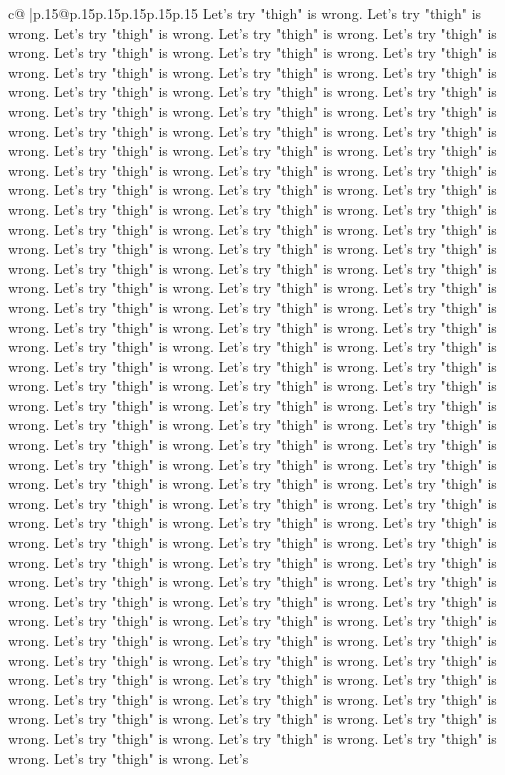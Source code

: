 \documentclass{article}
\begin{document}
{\begin{supertabular}{c@{$\;$}|p{.15\linewidth}@{}p{.15\linewidth}p{.15\linewidth}p{.15\linewidth}p{.15\linewidth}p{.15\linewidth}}
{{{Let's try "thigh" is wrong. Let's try "thigh" is wrong. Let's try "thigh" is wrong. Let's try "thigh" is wrong. Let's try "thigh" is wrong. Let's try "thigh" is wrong. Let's try "thigh" is wrong. Let's try "thigh" is wrong. Let's try "thigh" is wrong. Let's try "thigh" is wrong. Let's try "thigh" is wrong. Let's try "thigh" is wrong. Let's try "thigh" is wrong. Let's try "thigh" is wrong. Let's try "thigh" is wrong. Let's try "thigh" is wrong. Let's try "thigh" is wrong. Let's try "thigh" is wrong. Let's try "thigh" is wrong. Let's try "thigh" is wrong. Let's try "thigh" is wrong. Let's try "thigh" is wrong. Let's try "thigh" is wrong. Let's try "thigh" is wrong. Let's try "thigh" is wrong. Let's try "thigh" is wrong. Let's try "thigh" is wrong. Let's try "thigh" is wrong. Let's try "thigh" is wrong. Let's try "thigh" is wrong. Let's try "thigh" is wrong. Let's try "thigh" is wrong. Let's try "thigh" is wrong. Let's try "thigh" is wrong. Let's try "thigh" is wrong. Let's try "thigh" is wrong. Let's try "thigh" is wrong. Let's try "thigh" is wrong. Let's try "thigh" is wrong. Let's try "thigh" is wrong. Let's try "thigh" is wrong. Let's try "thigh" is wrong. Let's try "thigh" is wrong. Let's try "thigh" is wrong. Let's try "thigh" is wrong. Let's try "thigh" is wrong. Let's try "thigh" is wrong. Let's try "thigh" is wrong. Let's try "thigh" is wrong. Let's try "thigh" is wrong. Let's try "thigh" is wrong. Let's try "thigh" is wrong. Let's try "thigh" is wrong. Let's try "thigh" is wrong. Let's try "thigh" is wrong. Let's try "thigh" is wrong. Let's try "thigh" is wrong. Let's try "thigh" is wrong. Let's try "thigh" is wrong. Let's try "thigh" is wrong. Let's try "thigh" is wrong. Let's try "thigh" is wrong. Let's try "thigh" is wrong. Let's try "thigh" is wrong. Let's try "thigh" is wrong. Let's try "thigh" is wrong. Let's try "thigh" is wrong. Let's try "thigh" is wrong. Let's try "thigh" is wrong. Let's try "thigh" is wrong. Let's try "thigh" is wrong. Let's try "thigh" is wrong. Let's try "thigh" is wrong. Let's try "thigh" is wrong. Let's try "thigh" is wrong. Let's try "thigh" is wrong. Let's try "thigh" is wrong. Let's try "thigh" is wrong. Let's try "thigh" is wrong. Let's try "thigh" is wrong. Let's try "thigh" is wrong. Let's try "thigh" is wrong. Let's try "thigh" is wrong. Let's try "thigh" is wrong. Let's try "thigh" is wrong. Let's try "thigh" is wrong. Let's try "thigh" is wrong. Let's try "thigh" is wrong. Let's try "thigh" is wrong. Let's try "thigh" is wrong. Let's try "thigh" is wrong. Let's try "thigh" is wrong. Let's try "thigh" is wrong. Let's try "thigh" is wrong. Let's try "thigh" is wrong. Let's try "thigh" is wrong. Let's try "thigh" is wrong. Let's try "thigh" is wrong. Let's try "thigh" is wrong. Let's try "thigh" is wrong. Let's try "thigh" is wrong. Let's try "thigh" is wrong. Let's try "thigh" is wrong. Let's try "thigh" is wrong. Let's try "thigh" is wrong. Let's try "thigh" is wrong. Let's try "thigh" is wrong. Let's try "thigh" is wrong. Let's try "thigh" is wrong. Let's try "thigh" is wrong. Let's try "thigh" is wrong. Let's try "thigh" is wrong. Let's try "thigh" is wrong. Let's try "thigh" is wrong. Let's }}}
\end{supertabular}}
\end{document}
